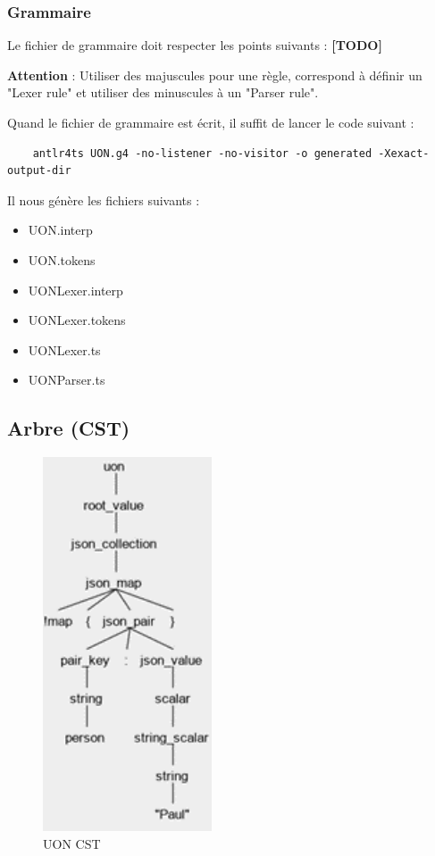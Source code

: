 \documentclass[
    iict, %
    il, %
]{heig-tb}
\begin{document}
\subsubsection{Grammaire}
Le fichier de grammaire doit respecter les points suivants : \textbf{[TODO]}

\textbf{Attention} : Utiliser des majuscules pour une règle, correspond à définir un "Lexer rule" et utiliser des minuscules à un  "Parser rule".

Quand le fichier de grammaire est écrit, il suffit de lancer le code suivant :

\begin{lstlisting}
    antlr4ts UON.g4 -no-listener -no-visitor -o generated -Xexact-output-dir
\end{lstlisting}

Il nous génère les fichiers suivants :
\begin{itemize}
    \item UON.interp
    \item UON.tokens
    \item UONLexer.interp
    \item UONLexer.tokens
    \item UONLexer.ts
    \item UONParser.ts
\end{itemize}

\subsection{Arbre (CST)}
\begin{figure}[!ht]
    \begin{center}
        \includegraphics[width=5cm]{assets/figures/tree.png}
    \end{center}
    \caption[UON CST]{\label{test2} UON CST}
\end{figure}
\end{document}
